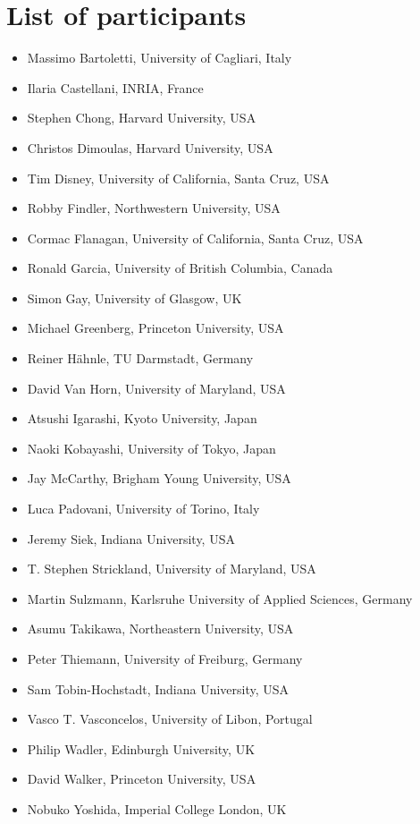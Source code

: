 \documentclass[11pt]{article}
\begin{document}
\section{List of participants}
\begin{itemize}
\item Massimo Bartoletti, University of Cagliari, Italy
\item Ilaria		Castellani, INRIA, France
\item Stephen Chong, Harvard University, USA
\item Christos		Dimoulas, Harvard University, USA
\item Tim		Disney, University of California, Santa Cruz, USA
\item Robby		Findler, Northwestern University, USA
\item Cormac		Flanagan, University of California, Santa Cruz, USA
\item Ronald		Garcia, University of British Columbia, Canada
\item Simon		Gay, University of Glasgow, UK
\item Michael		Greenberg, Princeton University, USA
\item Reiner		H{\"a}hnle, TU Darmstadt, Germany
\item David	Van	Horn, University of Maryland, USA
\item Atsushi		Igarashi, Kyoto University, Japan
\item Naoki		Kobayashi, University of Tokyo, Japan
\item Jay		McCarthy, Brigham Young University, USA
\item Luca		Padovani, University of Torino, Italy
\item Jeremy		Siek, Indiana University, USA
\item T.	Stephen	Strickland, University of Maryland, USA
\item Martin		Sulzmann, Karlsruhe University of Applied Sciences, Germany
\item Asumu		Takikawa, Northeastern University, USA
\item Peter		Thiemann, University of Freiburg, Germany
\item Sam		Tobin-Hochstadt, Indiana University, USA
\item Vasco	T.	Vasconcelos, University of Libon, Portugal
\item Philip		Wadler, Edinburgh University, UK
\item David		Walker, Princeton University, USA
\item Nobuko		Yoshida, Imperial College London, UK
\end{itemize}
\end{document}
